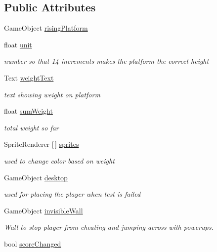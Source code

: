 \subsection*{Public Attributes}
\begin{DoxyCompactItemize}
\item 
Game\+Object \hyperlink{class_rising_platform_controller_aee1892eb7e64522025a2d1e1e254559e}{rising\+Platform}
\item 
float \hyperlink{class_rising_platform_controller_a0893b61a3a698787d4a69609b2e54db8}{unit}
\begin{DoxyCompactList}\small\item\em number so that 14 increments makes the platform the correct height \end{DoxyCompactList}\item 
Text \hyperlink{class_rising_platform_controller_ab5c78cdbb1ecc9e4ea72493e0013196e}{weight\+Text}
\begin{DoxyCompactList}\small\item\em text showing weight on platform \end{DoxyCompactList}\item 
float \hyperlink{class_rising_platform_controller_ae48d2737933574ae34b2eea2cff87be7}{sum\+Weight}
\begin{DoxyCompactList}\small\item\em total weight so far \end{DoxyCompactList}\item 
Sprite\+Renderer \mbox{[}$\,$\mbox{]} \hyperlink{class_rising_platform_controller_a56c49369542b88f9d2a1eaa7624786cf}{sprites}
\begin{DoxyCompactList}\small\item\em used to change color based on weight \end{DoxyCompactList}\item 
Game\+Object \hyperlink{class_rising_platform_controller_ade27e9e3be7bc58e746e0d5ba1461747}{desktop}
\begin{DoxyCompactList}\small\item\em used for placing the player when test is failed \end{DoxyCompactList}\item 
Game\+Object \hyperlink{class_rising_platform_controller_aa15f6065f1dc6e86bfc34be46b636621}{invisible\+Wall}
\begin{DoxyCompactList}\small\item\em Wall to stop player from cheating and jumping across with powerups. \end{DoxyCompactList}\item 
bool \hyperlink{class_rising_platform_controller_abb132a32dd02ba1e7f2bb020489c5911}{score\+Changed}
\end{DoxyCompactItemize}


